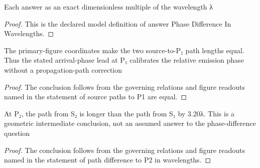 \begin{definition}
  \label{def:physics:phyx-mini-0087:phyxminiproblems-problemphyxmini0087-answerphasedifferenceinwavelengths}
  Each answer as an exact dimensionless multiple of the wavelength λ
\end{definition}
\begin{proof}
  This is the declared model definition of answer Phase Difference In Wavelengths.
\end{proof}
\begin{lemma}
  \label{lem:physics:phyx-mini-0087:phyxminiproblems-problemphyxmini0087-source-paths-to-p1-are-equal}
  The primary-figure coordinates make the two source-to-P₁ path lengths equal. Thus the stated arrival-phase lead at P₁ calibrates the relative emission phase without a propagation-path correction
\end{lemma}
\begin{proof}
  The conclusion follows from the governing relations and figure readouts named in the statement of source paths to P1 are equal.
\end{proof}
\begin{lemma}
  \label{lem:physics:phyx-mini-0087:phyxminiproblems-problemphyxmini0087-path-difference-to-p2-in-wavelengths}
  At P₂, the path from S₂ is longer than the path from S₁ by 3.20λ. This is a geometric intermediate conclusion, not an assumed answer to the phase-difference question
\end{lemma}
\begin{proof}
  The conclusion follows from the governing relations and figure readouts named in the statement of path difference to P2 in wavelengths.
\end{proof}
